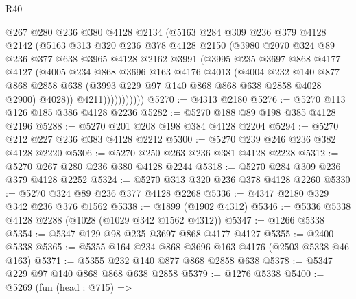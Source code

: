 \begin{lexlean}{R40}
\begin{coremodule}
                  @267
                  @280
                  @236
                  @380
                  @4128
                  @2134
                  (@5163
                    @284
                    @309
                    @236
                    @379
                    @4128
                    @2142
                    (@5163
                      @313
                      @320
                      @236
                      @378
                      @4128
                      @2150
                      (@3980
                        @2070
                        @324
                        @89
                        @236
                        @377
                        @638
                        @3965
                        @4128
                        @2162
                        @3991
                        (@3995
                          @235
                          @3697
                          @868
                          @4177
                          @4127
                          (@4005
                            @234
                            @868
                            @3696
                            @163
                            @4176
                            @4013
                            (@4004
                              @232
                              @140
                              @877
                              @868
                              @2858
                              @638
                              (@3993 @229 @97 @140 @868 @868 @638 @2858 @4028 @2900)
                              @4028))
                          @4211)))))))))))
@5270 := @4313 @2180
@5276 := @5270 @113 @126 @185 @386 @4128 @2236
@5282 := @5270 @188 @89 @198 @385 @4128 @2196
@5288 := @5270 @201 @208 @198 @384 @4128 @2204
@5294 := @5270 @212 @227 @236 @383 @4128 @2212
@5300 := @5270 @239 @246 @236 @382 @4128 @2220
@5306 := @5270 @250 @263 @236 @381 @4128 @2228
@5312 := @5270 @267 @280 @236 @380 @4128 @2244
@5318 := @5270 @284 @309 @236 @379 @4128 @2252
@5324 := @5270 @313 @320 @236 @378 @4128 @2260
@5330 := @5270 @324 @89 @236 @377 @4128 @2268
@5336 := @4347 @2180 @329 @342 @236 @376 @1562
@5338 := @1899 (@1902 @4312)
@5346 := @5336 @5338 @4128 @2288 (@1028 (@1029 @342 @1562 @4312))
@5347 := @1266 @5338
@5354 := @5347 @129 @98 @235 @3697 @868 @4177 @4127
@5355 := @2400 @5338
@5365 := @5355 @164 @234 @868 @3696 @163 @4176 (@2503 @5338 @46 @163)
@5371 := @5355 @232 @140 @877 @868 @2858 @638
@5378 := @5347 @229 @97 @140 @868 @868 @638 @2858
@5379 := @1276 @5338
@5400 := @5269
    (fun (head : @715) =>

\end{coremodule}
\end{lexlean}
